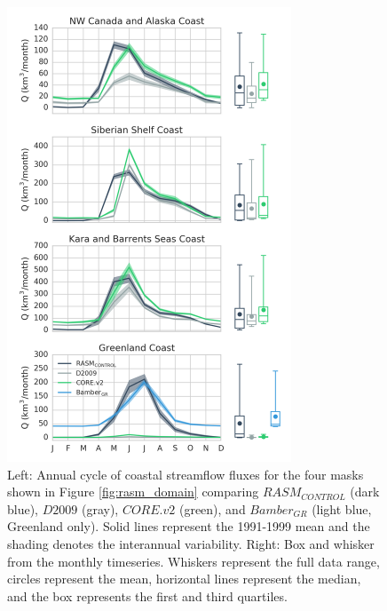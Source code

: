\documentclass[jgrga, draft]{agutex}
\begin{document}
\clearpage
\begin{figure}
\noindent\includegraphics[width=20pc,natwidth=1]{coastal_hydrographs}
\caption{Left: Annual cycle of coastal streamflow fluxes for the four masks shown in Figure \ref{fig:rasm_domain} comparing $RASM_{CONTROL}$ (dark blue), $D2009$ (gray), $CORE.v2$ (green), and $Bamber_{GR}$ (light blue, Greenland only).
Solid lines represent the 1991-1999 mean and the shading denotes the interannual variability.
Right: Box and whisker from the monthly timeseries.
Whiskers represent the full data range, circles represent the mean, horizontal lines represent the median, and the box represents the first and third quartiles.
}
\label{fig:coastal_hydrographs}
\end{figure}
\end{document}
